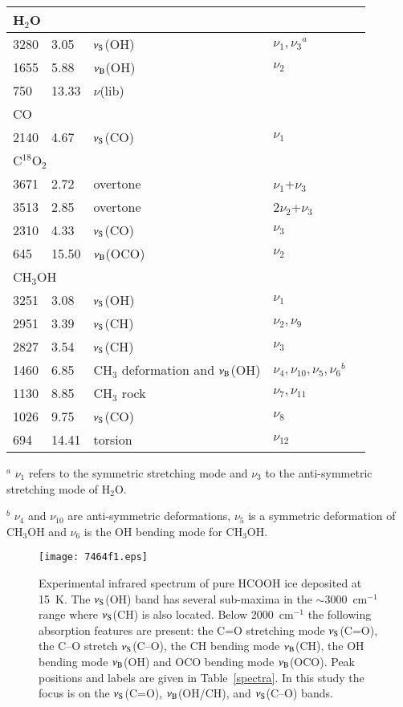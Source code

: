 \documentclass{aa}
\begin{document}
\begin{table*}
\begin{center}
\begin{tabular}{lllll}
\hline
\multicolumn{4}{l}{H$_2$O}\\
\hline
3280 & \phantom{1}3.05 & $\nu_{\rm S}$(OH) & $\nu_1,\nu_3$$^a$ & \\
1655 & \phantom{1}5.88 & $\nu_{\rm B}$(OH) & $\nu_2$\\
\phantom{1}750  & 13.33 & $\nu$(lib)        \\ 
\hline
\multicolumn{4}{l}{CO}\\
\hline
2140 & \phantom{1}4.67 & $\nu_{\rm S}$(CO) & $\nu_1$\\
\hline
\multicolumn{4}{l}{C$^{18}$O$_2$}\\
\hline
3671 & \phantom{1}2.72   &  overtone &  $\nu_1$+$\nu_3$\\
3513 & \phantom{1}2.85   &  overtone & 2$\nu_2$+$\nu_3$\\
2310 & \phantom{1}4.33 & $\nu_{\rm S}$(CO) & $\nu_3$\\
\phantom{1}645  & 15.50 & $\nu_{\rm B}$(OCO) & $\nu_2$\\
\hline
\multicolumn{4}{l}{CH$_3$OH}\\
\hline
3251 & \phantom{1}3.08 & $\nu_{\rm S}$(OH) & $\nu_1$\\
2951 & \phantom{1}3.39 & $\nu_{\rm S}$(CH) & $\nu_2,\nu_9$\\
2827 & \phantom{1}3.54 & $\nu_{\rm S}$(CH) & $\nu_3$\\
1460 & \phantom{1}6.85 & CH$_3$ deformation and $\nu_{\rm B}$(OH) & $\nu_4,\nu_{10},\nu_5, \nu_6$$^b$\\
1130 & \phantom{1}8.85 & CH$_3$ rock & $\nu_7, \nu_{11}$\\
1026 & \phantom{1}9.75 & $\nu_{\rm S}$(CO) & $\nu_8$\\
\phantom{1}694  & 14.41 & torsion & $\nu_{12}$\\ 
\hline
\end{tabular}
\end{center}

$^a$ $\nu_1$ refers to the symmetric stretching mode and
$\nu_3$ to the anti-symmetric stretching mode of H$_2$O.

$^b$ $\nu_4$ and $\nu_{10}$ are anti-symmetric deformations, $\nu_5$
is a symmetric deformation of CH$_3$OH and $\nu_6$ is the OH bending
mode for CH$_3$OH.

\end{table*}

\begin{figure}
\centering
\texttt{[image: 7464f1.eps]}
\caption{Experimental infrared spectrum of pure HCOOH ice deposited at
15~K. The $\nu_{\rm S}$(OH) band has several sub-maxima in the
$\sim$3000~cm$^{-1}$ range where $\nu_{\rm S}$(CH) is also
located. Below 2000~cm$^{-1}$ the following absorption features are
present: the C=O stretching mode $\nu_{\rm S}$(C=O), the C--O stretch
$\nu_{\rm S}$(C--O), the CH bending mode $\nu_{\rm B}$(CH), the OH
bending mode $\nu_{\rm B}$(OH) and OCO bending mode $\nu_{\rm
B}$(OCO). Peak positions and labels are given in
Table~\ref{spectra}. In this study the focus is on the $\nu_{\rm
S}$(C=O), $\nu_{\rm B}$(OH/CH), and $\nu_{\rm S}$(C--O)
bands.}\label{spec1}
\end{figure}
\end{document}

